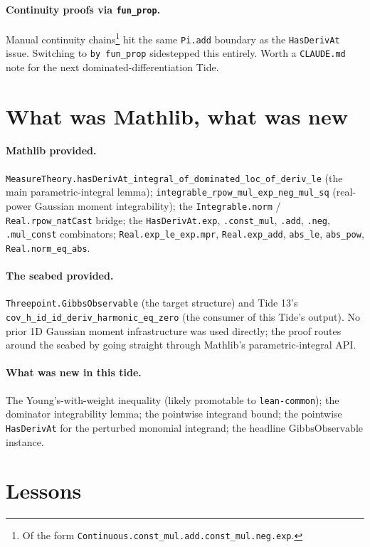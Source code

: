 \documentclass[11pt]{article}
\newcommand{\GO}{\mathrm{GibbsObservable}}
\begin{document}
\paragraph{Continuity proofs via \texttt{fun\_prop}.} Manual continuity
chains\footnote{Of the form
\texttt{Continuous.const\_mul.add.const\_mul.neg.exp}.} hit the same
\texttt{Pi.add} boundary as the \texttt{HasDerivAt} issue. Switching
to \texttt{by fun\_prop} sidestepped this entirely. Worth a
\texttt{CLAUDE.md} note for the next dominated-differentiation Tide.

\section{What was Mathlib, what was new}

\paragraph{Mathlib provided.}
\texttt{MeasureTheory.hasDerivAt\_integral\_of\_dominated\_loc\_of\_deriv\_le}
(the main parametric-integral lemma);
\texttt{integrable\_rpow\_mul\_exp\_neg\_mul\_sq} (real-power Gaussian
moment integrability); the \texttt{Integrable.norm} /
\texttt{Real.rpow\_natCast} bridge; the \texttt{HasDerivAt.exp},
\texttt{.const\_mul}, \texttt{.add}, \texttt{.neg}, \texttt{.mul\_const}
combinators; \texttt{Real.exp\_le\_exp.mpr}, \texttt{Real.exp\_add},
\texttt{abs\_le}, \texttt{abs\_pow}, \texttt{Real.norm\_eq\_abs}.

\paragraph{The seabed provided.}
\texttt{Threepoint.GibbsObservable} (the target structure) and Tide
13's \texttt{cov\_h\_id\_id\_deriv\_harmonic\_eq\_zero} (the consumer
of this Tide's output). No prior 1D Gaussian moment infrastructure
was used directly; the proof routes around the seabed by going
straight through Mathlib's parametric-integral API.

\paragraph{What was new in this tide.}
The Young's-with-weight inequality (likely promotable to
\texttt{lean-common}); the dominator integrability lemma; the
pointwise integrand bound; the pointwise \texttt{HasDerivAt} for the
perturbed monomial integrand; the headline \(\GO\) instance.

\section{Lessons}
\end{document}
